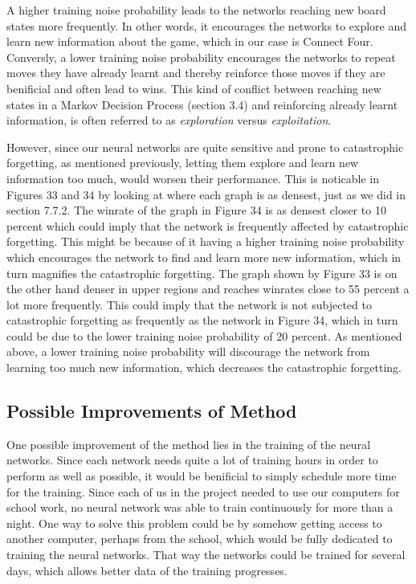 \documentclass[titlepage]{article}
\begin{document}
\vskip 0.2cm

\noindent
A higher training noise probability leads to the networks reaching new board states more frequently. In other words, it encourages the networks to explore and learn new information about the game, which in our case is Connect Four. Conversly, a lower training noise probability encourages the networks to repeat moves they have already learnt and thereby reinforce those moves if they are benificial and often lead to wins. This kind of conflict between reaching new states in a Markov Decision Process (section 3.4) and reinforcing already learnt information, is often referred to as \emph{exploration} versus \emph{exploitation}.

\vskip 0.2cm

\noindent
However, since our neural networks are quite sensitive and prone to catastrophic forgetting, as mentioned previously, letting them explore and learn new information too much, would worsen their performance. This is noticable in Figures 33 and 34 by looking at where each graph is as densest, just as we did in section 7.7.2. The winrate of the graph in Figure 34 is as densest closer to 10 percent which could imply that the network is frequently affected by catastrophic forgetting. This might be because of it having a higher training noise probability which encourages the network to find and learn more new information, which in turn magnifies the catastrophic forgetting. The graph shown by Figure 33 is on the other hand denser in upper regions and reaches winrates close to 55 percent a lot more frequently. This could imply that the network is not subjected to catastrophic forgetting as frequently as the network in Figure 34, which in turn could be due to the lower training noise probability of 20 percent. As mentioned above, a lower training noise probability will discourage the network from learning too much new information, which decreases the catastrophic forgetting.

\newpage

\subsection{Possible Improvements of Method}

\vskip 0.2cm

One possible improvement of the method lies in the training of the neural networks. Since each network needs quite a lot of training hours in order to perform as well as possible, it would be benificial to simply schedule more time for the training. Since each of us in the project needed to use our computers for school work, no neural network was able to train continuously for more than a night. One way to solve this problem could be by somehow getting access to another computer, perhaps from the school, which would be fully dedicated to training the neural networks. That way the networks could be trained for several days, which allows better data of the training progresses.
\end{document}
